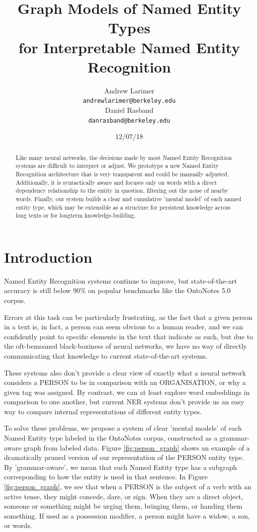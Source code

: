 \documentclass[11pt,a4paper]{article}
\title{Graph Models of Named Entity Types\\for Interpretable Named Entity Recognition}
\author{Andrew Larimer \\
  {\tt andrewlarimer@berkeley.edu} \\\And
  Daniel Rasband \\
  {\tt danrasband@berkeley.edu} \\}
\date{12/07/18}
\begin{document}
\maketitle
\begin{abstract}
Like many neural networks, the decisions made by most Named Entity Recognition systems are difficult to interpret or adjust. We prototype a new Named Entity Recognition architecture that is very transparent and could be manually adjusted. Additionally, it is syntactically aware and focuses only on words with a direct dependency relationship to the entity in question, filtering out the noise of nearby words. Finally, our system builds a clear and cumulative 'mental model' of each named entity type, which may be extensible as a structure for persistent knowledge across long texts or for longterm knowledge-building.
\end{abstract}

\section{Introduction}

Named Entity Recognition systems continue to improve, but state-of-the-art accuracy is still below 90\% on popular benchmarks like the OntoNotes 5.0 corpus.

Errors at this task can be particularly frustrating, as the fact that a given person in a text is, in fact, a person can seem obvious to a human reader, and we can confidently point to specific elements in the text that indicate as such, but due to the oft-bemoaned black-boxiness of neural networks, we have no way of directly communicating that knowledge to current state-of-the-art systems.

These systems also don't provide a clear view of exactly what a neural network considers a PERSON to be in comparison with an ORGANISATION, or why a given tag was assigned. By contrast, we can at least explore word embeddings in comparison to one another, but current NER systems don't provide us an easy way to compare internal representations of different entity types.

To solve these problems, we propose a system of clear 'mental models' of each Named Entity type labeled in the OntoNotes corpus, constructed as a grammar-aware graph from labeled data. Figure \ref{fig:person_graph} shows an example of a dramatically pruned version of our representation of the PERSON entity type. By 'grammar-aware', we mean that each Named Entity type has a subgraph corresponding to how the entity is used in that sentence. In Figure  \ref{fig:person_graph}, we see that when a PERSON is the subject of a verb with an active tense, they might concede, dare, or sign. When they are a direct object, someone or something might be urging them, bringing them, or handing them something. If used as a possession modifier, a person might have a widow, a son, or words.
\end{document}
